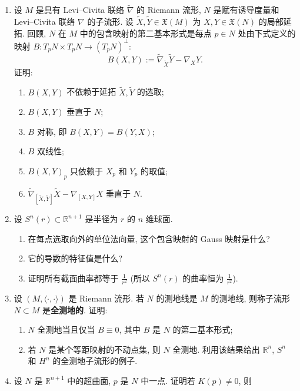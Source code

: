 \begin{RiemannExercise}\label{ex:isometric-immersions}
\begin{enumerate}[label=(\arabic*),ref=\arabic*,leftmargin=*]
\item\label{ex:second-fundamental-form-properties} 设 $M$ 是具有 Levi–Civita 联络 $\widetilde\nabla$ 的 Riemann 流形, $N$ 是赋有诱导度量和 Levi–Civita 联络 $\nabla$ 的子流形. 设 $\widetilde X,\widetilde Y\in\mathfrak{X}(M)$ 为 $X,Y\in\mathfrak{X}(N)$ 的局部延拓. 回顾, $N$ 在 $M$ 中的包含映射的第二基本形式是每点 $p\in N$ 处由下式定义的映射 $B:T_pN\times T_pN\to(T_pN)^\perp$:
\[
  B(X,Y):=\widetilde\nabla_{\widetilde X}\widetilde Y-\nabla_XY.
\]
证明:
\begin{enumerate}[label=(\alph*),leftmargin=*]
\item $B(X,Y)$ 不依赖于延拓 $\widetilde X,\widetilde Y$ 的选取;
\item $B(X,Y)$ 垂直于 $N$;
\item $B$ 对称, 即 $B(X,Y)=B(Y,X)$;
\item $B$ 双线性;
\item $B(X,Y)_p$ 只依赖于 $X_p$ 和 $Y_p$ 的取值;
\item $\widetilde\nabla_{[\widetilde X,\widetilde Y]}\widetilde X-\nabla_{[X,Y]}X$ 垂直于 $N$.
\end{enumerate}
\item\label{ex:constant-curvature-of-round-sphere} 设 $S^n(r)\subset\mathbb{R}^{n+1}$ 是半径为 $r$ 的 $n$ 维球面.
\begin{enumerate}[label=(\alph*),leftmargin=*]
\item 在每点选取向外的单位法向量, 这个包含映射的 Gauss 映射是什么?
\item 它的导数的特征值是什么?
\item 证明所有截面曲率都等于 $\frac1{r^2}$ (所以 $S^n(r)$ 的曲率恒为 $\frac1{r^2}$).
\end{enumerate}
\item\label{ex:totally-geodesic-submanifolds} 设 $(M,\langle\cdot,\cdot\rangle)$ 是 Riemann 流形. 若 $N$ 的测地线是 $M$ 的测地线, 则称子流形 $N\subset M$ 是\textbf{全测地的}. 证明:
\begin{enumerate}[label=(\alph*),leftmargin=*]
\item $N$ 全测地当且仅当 $B\equiv0$, 其中 $B$ 是 $N$ 的第二基本形式;
\item 若 $N$ 是某个等距映射的不动点集, 则 $N$ 全测地. 利用该结果给出 $\mathbb{R}^n$, $S^n$ 和 $H^n$ 的全测地子流形的例子.
\end{enumerate}
\item\label{ex:gauss-curvature-as-ratio-of-volumes} 设 $N$ 是 $\mathbb{R}^{n+1}$ 中的超曲面, $p$ 是 $N$ 中一点. 证明若 $K(p)\ne0$, 则

\end{enumerate}
\end{RiemannExercise}
